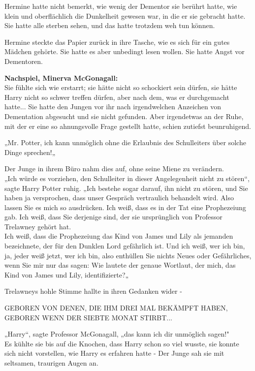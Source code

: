 {Hermine hatte nicht bemerkt, wie wenig der Dementor sie berührt hatte, wie klein und oberflächlich die Dunkelheit gewesen war, in die er sie gebracht hatte. Sie hatte alle sterben sehen, und das hatte trotzdem weh tun können.

Hermine steckte das Papier zurück in ihre Tasche, wie es sich für ein gutes Mädchen gehörte. Sie hatte es aber unbedingt lesen wollen. Sie hatte Angst vor Dementoren.

\textbf{Nachspiel, Minerva McGonagall:}\\ Sie fühlte sich wie erstarrt; sie hätte nicht so schockiert sein dürfen, sie hätte Harry nicht so schwer treffen dürfen, aber nach dem, was er durchgemacht hatte... Sie hatte den Jungen vor ihr nach irgendwelchen Anzeichen von Dementation abgesucht und sie nicht gefunden. Aber irgendetwas an der Ruhe, mit der er eine so ahnungsvolle Frage gestellt hatte, schien zutiefst beunruhigend.

„Mr. Potter, ich kann unmöglich ohne die Erlaubnis des Schulleiters über solche Dinge sprechen!„

Der Junge in ihrem Büro nahm dies auf, ohne seine Miene zu verändern.\\ „Ich würde es vorziehen, den Schulleiter in dieser Angelegenheit nicht zu stören“, sagte Harry Potter ruhig. „Ich bestehe sogar darauf, ihn nicht zu stören, und Sie haben ja versprochen, dass unser Gespräch vertraulich behandelt wird. Also lassen Sie es mich so ausdrücken. Ich weiß, dass es in der Tat eine Prophezeiung gab. Ich weiß, dass Sie derjenige sind, der sie ursprünglich von Professor Trelawney gehört hat.\\ Ich weiß, dass die Prophezeiung das Kind von James und Lily als jemanden bezeichnete, der für den Dunklen Lord gefährlich ist. Und ich weiß, wer ich bin, ja, jeder weiß jetzt, wer ich bin, also enthüllen Sie nichts Neues oder Gefährliches, wenn Sie mir nur das sagen: Wie lautete der genaue Wortlaut, der mich, das Kind von James und Lily, identifizierte?„

Trelawneys hohle Stimme hallte in ihren Gedanken wider -

GEBOREN VON DENEN, DIE IHM DREI MAL BEKÄMPFT HABEN, GEBOREN WENN DER SIEBTE MONAT STIRBT...

„Harry“, sagte Professor McGonagall, „das kann ich dir unmöglich sagen!"\\ Es kühlte sie bis auf die Knochen, dass Harry schon so viel wusste, sie konnte sich nicht vorstellen, wie Harry es erfahren hatte - Der Junge sah sie mit seltsamen, traurigen Augen an.

}
